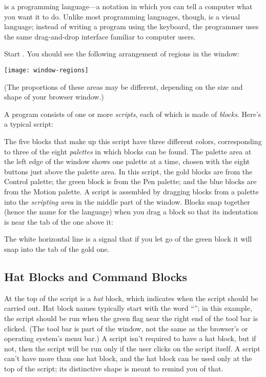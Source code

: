 \documentclass{report}
\begin{document}
\Snap{} is a programming language---a notation in which you can tell a computer what you want it to do. Unlike most programming languages, though, \Snap{} is a visual language; instead of writing a program using the keyboard, the \Snap{} programmer uses the same drag-and-drop interface familiar to computer users.

Start \Snap{}. You should see the following arrangement of regions in the window:

\begin{center}
\texttt{[image: window-regions]}
\end{center}

(The proportions of these areas may be different, depending on the size and shape of your browser window.)

A \Snap{} program consists of one or more \emph{scripts}, each of which is made of \emph{blocks}. Here's a typical script:


The five blocks that make up this script have three different colors, corresponding to three of the eight \emph{palettes} in which blocks can be found. The palette area at the left edge of the window shows one palette at a time, chosen with the eight buttons just above the palette area. In this script, the gold blocks are from the Control palette; the green block is from the Pen palette; and the blue blocks are from the Motion palette. A script is assembled by dragging blocks from a palette into the \emph{scripting area} in the middle part of the window. Blocks snap together (hence the name \Snap{} for the language) when you drag a block so that its indentation is near the tab of the one above it:


The white horizontal line is a signal that if you let go of the green block it will snap into the tab of the gold one.

\subsection{Hat Blocks and Command Blocks}

At the top of the script is a \emph{hat} block, which indicates when the script should be carried out. Hat block names typically start with the word ``''; in this example, the script should be run when the green flag near the right end of the \Snap{} tool bar is clicked. (The \Snap{} tool bar is part of the \Snap{} window, not the same as the browser's or operating system's menu bar.) A script isn't required to have a hat block, but if not, then the script will be run only if the user clicks on the script itself. A script can't have more than one hat block, and the hat block can be used only at the top of the script; its distinctive shape is meant to remind you of that.
\end{document}
